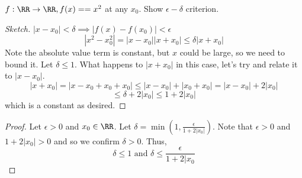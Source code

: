 \documentclass[12pt]{scrartcl}
\begin{document}
\begin{example}
  $f: \RR\to\RR, f(x)= = x^2$ at any $x_0$. Show $\epsilon-\delta$ criterion.

  \begin{proof}[Sketch]
    $|x-x_0| < \delta \implies |f(x) - f(x_0)| < \epsilon$
    \[|x^2 - x_0^2| = |x-x_0||x+x_0| \leq \delta |x + x_0|\]
    Note the absolute value term is constant, but $x$ could be large, so we need to bound it. 
    Let $\delta \leq 1$. What happens to $|x + x_0|$ in this case, let's try and relate it to 
    $|x-x_0|$. 
    \[|x + x_0| = |x - x_0 + x_0 + x_0| \leq |x-x_0| + |x_0 + x_0| = |x-x_0| + 2|x_0|\]
    \[\leq \delta + 2|x_0| \leq 1 + 2|x_0|\]
    which is a constant as desired. 
  \end{proof}

  \begin{proof}
    Let $\epsilon > 0$ and $x_0\in\RR$. Let $\delta = \min(1, \frac{\epsilon}{1 + 2|x_0|})$. Note that 
    $\epsilon > 0$ and $1 + 2|x_0| > 0$ and so we confirm $\delta > 0$. Thus, 
    \[\delta \leq 1 \text{ and } \delta \leq \frac{\epsilon}{1 + 2|x_0}\]
  \end{proof}
\end{example}
\end{document}
